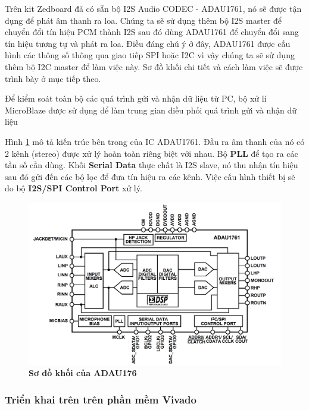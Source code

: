 Trên kit Zedboard đã có sẵn bộ I2S Audio CODEC - ADAU1761, nó sẽ được tận dụng để phát âm thanh ra loa. Chúng ta sẽ sử dụng thêm bộ I2S master để chuyển đổi tín hiệu PCM thành I2S sau đó dùng ADAU1761 để chuyển đổi sang tín hiệu tương tự và phát ra loa. Điều đáng chú ý ở đây, ADAU1761 được cấu hình các thông số thông qua giao tiếp SPI hoặc I2C vì vậy chúng ta sẽ sử dụng thêm bộ I2C master để làm việc này. Sơ đồ khối chi tiết và cách làm việc sẽ được trình bày ở mục tiếp theo.

Để kiểm soát toàn bộ các quá trình gửi và nhận dữ liệu từ PC, bộ xử lí MicroBlaze được sử dụng để làm trung gian điều phối quá trình gửi và nhận dữ liệu

Hình \ref{adau} mô tả kiến trúc bên trong của IC ADAU1761. Đầu ra âm thanh của nó có 2 kênh (stereo) được xử lý hoàn toàn riêng biệt với nhau. Bộ \textbf{PLL} để tạo ra các tần số cần dùng. Khối \textbf{Serial Data} thực chất là I2S slave, nó thu nhận tín hiệu sau đó gửi đến các bộ lọc để đưa tín hiệu ra các kênh. Việc cấu hình thiết bị sẽ do bộ \textbf{I2S/SPI Control Port} xử lý.

\begin{figure}[H]
    \centering
    \includegraphics[width=14cm]{Images/Chuong5/fpga/adau.png}
    \caption[Sơ đồ khối của ADAU1761]{\bfseries \fontsize{12pt}{0pt}\selectfont Sơ đồ khối của ADAU176}
    \label{adau}
\end{figure}



\subsubsection{Triển khai trên trên phần mềm Vivado}


